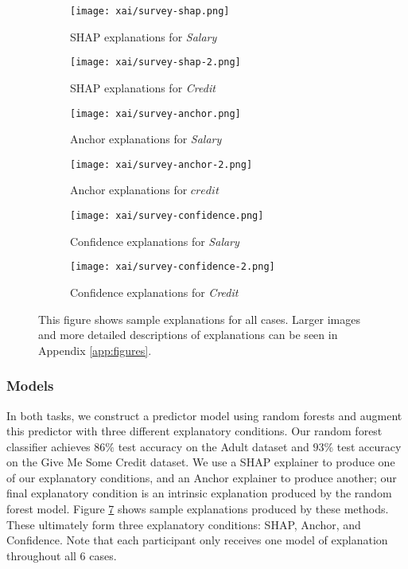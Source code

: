 \begin{figure}[htbp]
    \centering
    \begin{subfigure}[b]{0.45\textwidth}
        \texttt{[image: xai/survey-shap.png]}
        \caption{SHAP explanations for \emph{Salary}}
        \label{fig:shapsalary}
    \end{subfigure}
    \hfill
    \begin{subfigure}[b]{0.45\textwidth}
        \texttt{[image: xai/survey-shap-2.png]}
        \caption{SHAP explanations for \emph{Credit}}
        \label{fig:shapcredit}
    \end{subfigure}
    \medskip
    \begin{subfigure}[b]{0.45\textwidth}
        \texttt{[image: xai/survey-anchor.png]}
        \caption{Anchor explanations for \emph{Salary}}
        \label{fig:anchorsalary}
    \end{subfigure}
    \hfill
    \begin{subfigure}[b]{0.45\textwidth}
        \texttt{[image: xai/survey-anchor-2.png]}
        \caption{Anchor explanations for $credit$}
        \label{fig:anchorcredit}
    \end{subfigure}
    \medskip
    \begin{subfigure}[b]{0.45\textwidth}
        \texttt{[image: xai/survey-confidence.png]}
        \caption{Confidence explanations for \emph{Salary}}
        \label{fig:confidencesalary}
    \end{subfigure}
    \hfill
    \begin{subfigure}[b]{0.45\textwidth}
        \texttt{[image: xai/survey-confidence-2.png]}
        \caption{Confidence explanations for \emph{Credit}}
        \label{fig:confidencecredit}
    \end{subfigure}
    \caption{This figure shows sample explanations for all cases. Larger images and more detailed descriptions of explanations can be seen in Appendix \ref{app:figures}.}
    \label{fig:online_explanations}
\end{figure}

\subsubsection{Models}
In both tasks, we construct a predictor model using random forests and augment this predictor with three different explanatory conditions. Our random forest classifier achieves $86\%$ test accuracy on the Adult dataset and $93\%$ test accuracy on the Give Me Some Credit dataset. We use a SHAP explainer to produce one of our explanatory conditions, and an Anchor explainer to produce another; our final explanatory condition is an intrinsic explanation produced by the random forest model. Figure \ref{fig:online_explanations} shows sample explanations produced by these methods. These ultimately form three explanatory conditions: SHAP, Anchor, and Confidence. Note that each participant only receives one model of explanation throughout all 6 cases. 

